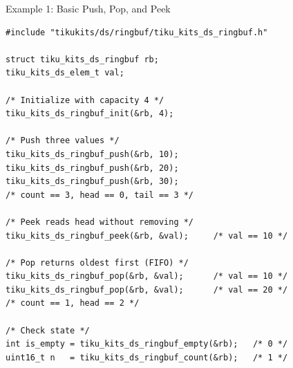 \documentclass[aspectratio=169, 10pt]{beamer}
\begin{document}
\begin{frame}[fragile]{Example 1: Basic Push, Pop, and Peek}
\begin{lstlisting}[style=cstyle,
  title={Basic ring buffer usage}]
#include "tikukits/ds/ringbuf/tiku_kits_ds_ringbuf.h"

struct tiku_kits_ds_ringbuf rb;
tiku_kits_ds_elem_t val;

/* Initialize with capacity 4 */
tiku_kits_ds_ringbuf_init(&rb, 4);

/* Push three values */
tiku_kits_ds_ringbuf_push(&rb, 10);
tiku_kits_ds_ringbuf_push(&rb, 20);
tiku_kits_ds_ringbuf_push(&rb, 30);
/* count == 3, head == 0, tail == 3 */

/* Peek reads head without removing */
tiku_kits_ds_ringbuf_peek(&rb, &val);     /* val == 10 */

/* Pop returns oldest first (FIFO) */
tiku_kits_ds_ringbuf_pop(&rb, &val);      /* val == 10 */
tiku_kits_ds_ringbuf_pop(&rb, &val);      /* val == 20 */
/* count == 1, head == 2 */

/* Check state */
int is_empty = tiku_kits_ds_ringbuf_empty(&rb);   /* 0 */
uint16_t n   = tiku_kits_ds_ringbuf_count(&rb);   /* 1 */
\end{lstlisting}
\end{frame}
\end{document}
